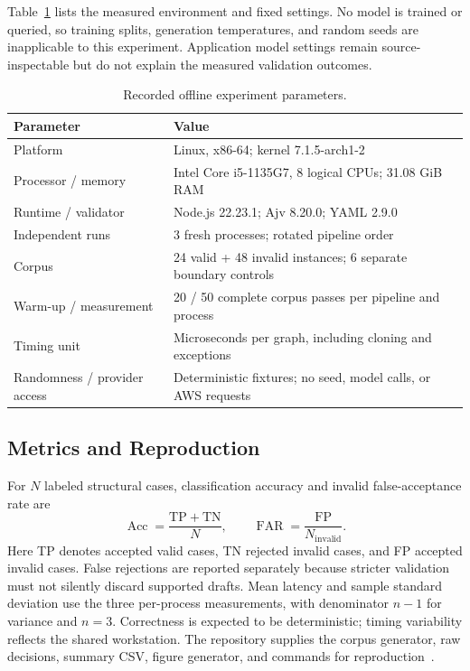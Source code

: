 Table~\ref{tab:parameters} lists the measured environment and fixed settings. No model is trained or queried, so training splits, generation temperatures, and random seeds are inapplicable to this experiment. Application model settings remain source-inspectable but do not explain the measured validation outcomes.
\begin{table}[t]
\caption{Recorded offline experiment parameters.}
\label{tab:parameters}
\centering\small
\begin{tabularx}{\linewidth}{lX}
\toprule
Parameter & Value \\
\midrule
Platform & Linux, x86-64; kernel 7.1.5-arch1-2 \\
Processor / memory & Intel Core i5-1135G7, 8 logical CPUs; 31.08 GiB RAM \\
Runtime / validator & Node.js 22.23.1; Ajv 8.20.0; YAML 2.9.0 \\
Independent runs & 3 fresh processes; rotated pipeline order \\
Corpus & 24 valid + 48 invalid instances; 6 separate boundary controls \\
Warm-up / measurement & 20 / 50 complete corpus passes per pipeline and process \\
Timing unit & Microseconds per graph, including cloning and exceptions \\
Randomness / provider access & Deterministic fixtures; no seed, model calls, or AWS requests \\
\bottomrule
\end{tabularx}
\end{table}

\subsection{Metrics and Reproduction}
For $N$ labeled structural cases, classification accuracy and invalid false-acceptance rate are
\begin{equation}
 \operatorname{Acc}=\frac{\mathrm{TP}+\mathrm{TN}}{N},\qquad
 \operatorname{FAR}=\frac{\mathrm{FP}}{N_{\mathrm{invalid}}}.
 \label{eq:metrics}
\end{equation}
Here TP denotes accepted valid cases, TN rejected invalid cases, and FP accepted invalid cases. False rejections are reported separately because stricter validation must not silently discard supported drafts. Mean latency and sample standard deviation use the three per-process measurements, with denominator $n-1$ for variance and $n=3$. Correctness is expected to be deterministic; timing variability reflects the shared workstation. The repository supplies the corpus generator, raw decisions, summary CSV, figure generator, and commands for reproduction~\cite{cloudcanvas}.


